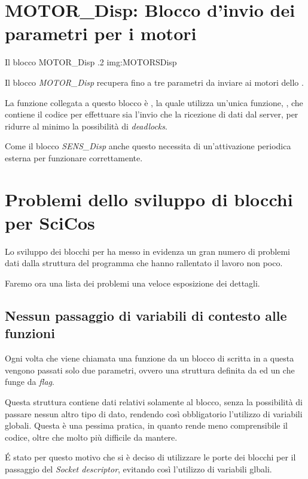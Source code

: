 \section[MOTOR\_Disp]{MOTOR\_Disp: Blocco d'invio dei parametri per i
motori}
        {Il blocco MOTOR\_Disp}
        {.2}
        {img:MOTORSDisp} 

Il blocco \emph{MOTOR\_Disp} recupera fino a tre parametri da inviare ai
motori dello \SPAM{}.

La funzione collegata a questo blocco è \linebreak {}, la quale utilizza un'unica funzione, , che contiene il codice per effettuare sia
l'invio che la ricezione di dati dal server, per ridurre al minimo la
possibilità di \emph{deadlocks}.

Come il blocco \emph{SENS\_Disp} anche questo necessita di un'attivazione
periodica esterna per funzionare correttamente.

\section{Problemi dello sviluppo di blocchi per SciCos}
\label{sec:whyitsucks}
Lo sviluppo dei blocchi per \SciCos{} ha messo in evidenza un gran numero
di problemi dati dalla struttura del programma che hanno rallentato il
lavoro non poco.

Faremo ora una lista dei problemi una veloce esposizione dei dettagli.

\subsection{Nessun passaggio di variabili di contesto alle funzioni}
Ogni volta che viene chiamata una funzione da un blocco di \SciCos{}
scritta in  a questa vengono passati solo due parametri, ovvero
una struttura definita da \SciCosLab{} ed un  che funge da
\emph{flag}.

Questa struttura contiene dati relativi solamente al blocco, senza la
possibilità di passare nessun altro tipo di dato, rendendo così
obbligatorio l'utilizzo di variabili globali. Questa è una pessima pratica,
in quanto rende meno comprensibile il codice, oltre che molto più difficile
da mantere.

\'E stato per questo motivo che si è deciso di utilizzare le porte dei
blocchi \SciCos{} per il passaggio del \emph{Socket descriptor}, evitando
così l'utilizzo di variabili glbali.

